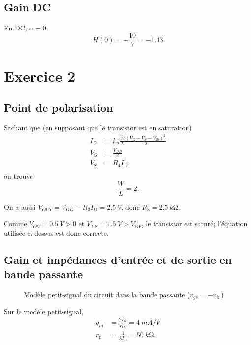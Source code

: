 \documentclass[frenchb,DIV=14]{scrartcl}
\begin{document}

\subsection*{Gain DC}
En DC, $\omega = 0$:
\[H(0) = -\frac{10}{7} = -1.43\]

\section*{Exercice 2}

\subsection*{Point de polarisation}

Sachant que (en supposant que le transistor est en saturation)
\begin{align*}
    I_D &= k_n \frac{W}{L} \frac{\left(V_G - V_S - V_{T0}\right)^2}{2} \\
    V_G &= \frac{V_{DD}}{2} \\
    V_S &= R_4 I_D, \\
\end{align*}
on trouve \[\frac{W}{L} = 2.\]

On a aussi $V_{OUT} = V_{DD} - R_3 I_D = \SI{2.5}{V}$, donc $R_3 = \SI{2.5}{k\ohm}$.

Comme $V_{OV} = \SI{0.5}{V} > 0$ et $V_{DS} = \SI{1.5}{V} > V_{OV}$, le transistor
est saturé; l'équation utilisée ci-dessus est donc correcte.

\subsection*{Gain et impédances d'entrée et de sortie en bande passante}
\begin{figure}[h]
    \centering
    \caption{Modèle petit-signal du circuit dans la bande passante ($v_{gs} = -v_{in}$)}
    \label{fig:pt-signal2}
\end{figure}
Sur le modèle petit-signal,
\begin{align*}
    g_m &= \frac{2I_D}{V_{OV}} = \SI{4}{mA/V} \\
    r_0 &= \frac{1}{\lambda I_D} = \SI{50}{k\ohm}.
\end{align*}
\end{document}
